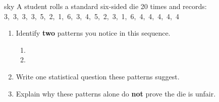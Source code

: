 \documentclass[10pt]{article}
\begin{document}
\namedateperiod

\vspace{0.14in}

\begin{scenariobox}[Context]{sky}
\small
A student rolls a standard six-sided die 20 times and records:\\[4pt]
3,\ 3,\ 3,\ 3,\ 5,\ 2,\ 1,\ 6,\ 3,\ 4,\ 5,\ 2,\ 3,\ 1,\ 6,\ 4,\ 4,\ 4,\ 4,\ 4
\end{scenariobox}

\vspace{0.1in}

\begin{practicebox}
\small
\begin{enumerate}[leftmargin=1.5em, itemsep=10pt]
  \item Identify \textbf{two} patterns you notice in this sequence.
        \begin{enumerate}[label=(\alph*), itemsep=4pt]
          \item \blank{10cm}
          \item \blank{10cm}
        \end{enumerate}

  \item Write one statistical question these patterns suggest.\\
        \writeline\writeline

  \item Explain why these patterns alone do \textbf{not} prove the die is unfair.\\
        \writeline\writeline\writeline
\end{enumerate}
\end{practicebox}
\end{document}
